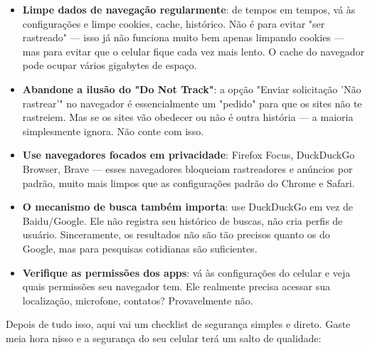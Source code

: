 \begin{itemize}
  \item \textbf{Limpe dados de navegação regularmente}: de tempos em tempos, vá às configurações e limpe cookies, cache, histórico. Não é para evitar "ser rastreado" — isso já não funciona muito bem apenas limpando cookies — mas para evitar que o celular fique cada vez mais lento. O cache do navegador pode ocupar vários gigabytes de espaço.
  \item \textbf{Abandone a ilusão do "Do Not Track"}: a opção "Enviar solicitação 'Não rastrear'" no navegador é essencialmente um "pedido" para que os sites não te rastreiem. Mas se os sites vão obedecer ou não é outra história — a maioria simplesmente ignora. Não conte com isso.
  \item \textbf{Use navegadores focados em privacidade}: Firefox Focus, DuckDuckGo Browser, Brave — esses navegadores bloqueiam rastreadores e anúncios por padrão, muito mais limpos que as configurações padrão do Chrome e Safari.
  \item \textbf{O mecanismo de busca também importa}: use DuckDuckGo em vez de Baidu/Google. Ele não registra seu histórico de buscas, não cria perfis de usuário. Sinceramente, os resultados não são tão precisos quanto os do Google, mas para pesquisas cotidianas são suficientes.
  \item \textbf{Verifique as permissões dos apps}: vá às configurações do celular e veja quais permissões seu navegador tem. Ele realmente precisa acessar sua localização, microfone, contatos? Provavelmente não.
\end{itemize}


Depois de tudo isso, aqui vai um checklist de segurança simples e direto. Gaste meia hora nisso e a segurança do seu celular terá um salto de qualidade:

